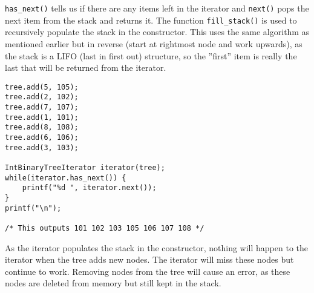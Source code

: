 \documentclass[a4paper,11pt]{article}
\begin{document}
\texttt{has_next()} tells us if there are any items left in the iterator and \texttt{next()} pops the next item from the stack and returns it.
The function \texttt{fill_stack()} is used to recursively populate the stack in the constructor.
This uses the same algorithm as mentioned earlier but in reverse (start at rightmost node and work upwards), as the stack is a LIFO (last in first out) structure, so the ''first'' item is really the last that will be returned from the iterator.

\begin{verbatim}
tree.add(5, 105);
tree.add(2, 102);
tree.add(7, 107);
tree.add(1, 101);
tree.add(8, 108);
tree.add(6, 106);
tree.add(3, 103);

IntBinaryTreeIterator iterator(tree);
while(iterator.has_next()) {
	printf("%d ", iterator.next());
}
printf("\n");

/* This outputs 101 102 103 105 106 107 108 */
\end{verbatim}

As the iterator populates the stack in the constructor, nothing will happen to the iterator when the tree adds new nodes. The iterator will miss these nodes but continue to work.
Removing nodes from the tree will cause an error, as these nodes are deleted from memory but still kept in the stack.
\end{document}
